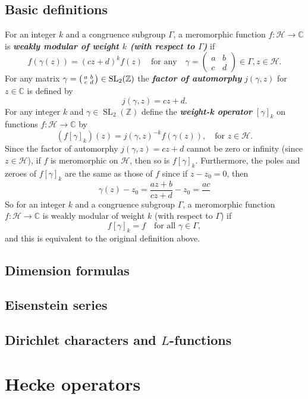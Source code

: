 \documentclass[10pt,leqno]{article}
\newcommand{\textib}[1]{\textbf{\textit{#1}}}
\DeclareMathOperator{\SL}{SL}
\begin{document}
\subsection{Basic definitions}
For an integer $k$ and a congruence subgroup $\varGamma$, a meromorphic function $f\colon \mathcal H\to \mathbb{C}$ is \textib{weakly modular of weight $k$ (with respect to $\varGamma$)} if \[f(\gamma(z)) = (cz+d)^kf(z)\quad\text{for any}\quad \gamma = \begin{pmatrix}
    a & b \\ c & d
\end{pmatrix}\in \varGamma, z\in \mathcal H.\]
For any matrix $\gamma=\begin{psmallmatrix}
    a & b \\ c & d
\end{psmallmatrix}\in \SL_2(\mathbb{Z})$ the \textib{factor of automorphy} $j(\gamma,z)$ for $z\in \mathbb{C}$ is defined by \[j(\gamma,z) = cz+d.\] For any integer $k$ and $\gamma\in \SL_2(\mathbb{Z})$ define the \textib{weight-k operator} $[\gamma]_k$ on functions $f\colon \mathcal H\to \mathbb{C}$ by \[(f[\gamma]_k)(z) = j(\gamma,z)^{-k}f(\gamma(z)),\quad\text{for } z\in \mathcal H.\]
Since the factor of automorphy $j(\gamma,z) = cz+d$ cannot be zero or infinity (since $z\in \mathcal H$), if $f$ is meromorphic on $\mathcal H$, then so is $f[\gamma]_k$. Furthermore, the poles and zeroes of $f[\gamma]_k$ are the same as those of $f$ since if $z-z_0 = 0$, then
\[\gamma(z)-z_0 = \frac{az+b}{cz+d}-z_0 = \frac{ac}{}\]
So for an integer $k$ and a congruence subgroup $\varGamma$, a meromorphic function $f\colon \mathcal H \to \mathbb{C}$ is weakly modular of weight $k$ (with respect to $\varGamma$) if \[f[\gamma]_k = f\quad\text{for all }\gamma\in \varGamma,\] and this is equivalent to the original definition above.
\subsection{Dimension formulas}
\subsection{Eisenstein series}
\subsection{Dirichlet characters and $L$-functions}

\newpage\section{Hecke operators}
\end{document}
